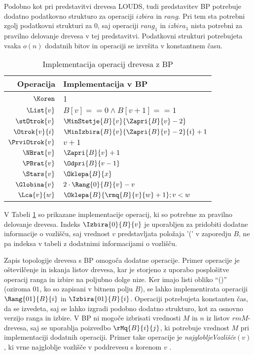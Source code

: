 Podobno kot pri predstavitvi drevesa LOUDS, tudi predstavitev BP potrebuje dodatno podatkovno strukturo za operaciji $izbira$ in $rang$. Pri tem sta potrebni zgolj podatkovni strukturi za $0$, saj  operaciji $rang_1$ in $izbira_1$ nista potrebni za pravilno delovanje drevesa v tej predstavitvi. Podatkovni strukturi potrebujeta vsaka $o(n)$ dodatnih bitov in operaciji se izvršita v konstantnem času.

\begin{table}[htb]
    \centering
      \caption{Implementacija operacij drevesa z BP}
    \begin{tabular}{r|l}
\textbf{Operacija}& \textbf{Implementacija v BP} \\\hline
         $\Koren$ &   1\\
         $\List{v}$ &    $B[v]==0 \wedge B[v+1]==1$\\
         $\stOtrok{v}$&  $\MinStetje{B}{v}{\Zapri{B}{v}-2}$\\
         $\Otrok{v}{i}$ &    $\MinIzbira{B}{v}{\Zapri{B}{v}-2}{i}+1$\\
         $\PrviOtrok{v}$&    $v+1$\\
         $\NBrat{v}$ &      $\Zapri{B}{v}+1$ \\
         $\PBrat{v}$ &      $\Odpri{B}{v-1}$ \\
         $\Stars{v}$ &      $\Oklepa{B}{x}$ \\
         $\Globina{v}$ &    $2\cdot \Rang{0}{B}{v}-v$ \\
         $\Lca{v}{w}$ &     $\Oklepa{B}{\rmq{B}{v}{w}+1};v<w$\\
    \end{tabular}  
    \label{tab:BPop}
\end{table}

V Tabeli \ref{tab:BPop} so prikazane implementacije operacij, ki so potrebne za pravilno delovanje drevesa. Indeks $\Izbira{0}{B}{v}$ je uporabljen za pridobiti dodatne informacije o vozlišču, saj vrednost $v$ predstavljata položaja '(' v zaporedju $B$, ne pa indeksa v tabeli z dodatnimi informacijami o vozlišču.

Zapis topologije drevesa s BP omogoča dodatne operacije. Primer operacije je oštevilčenje in iskanja listov drevesa, kar je storjeno z uporabo posplošitve operacij ranga in izbire na poljubno dolge nize. Ker imajo listi obliko \enquote{()} (oziroma $01$, ko so zapisani v bitnem polju $B$), se lahko implementirata operaciji $\Rang{01}{B}{i}$ in $\Izbira{01}{B}{i}$. Operaciji potrebujeta konstanten čas, da se izvedeta, saj se lahko izgradi podobno dodatno strukturo, kot za osnovno verzijo ranga in izbire. V BP ni mogoče izbrisati vrednosti $M$ in $n$ iz listov $rmM$-drevesa, saj se uporablja poizvedbo $\rMq{B}{i}{j}$, ki potrebuje vrednost $M$ pri implementaciji dodatnih operaciji. Primer take operacije je \textit{najglobljeVozlišče}$(v)$, ki vrne najgloblje vozlišče v poddrevesu s korenom $v$ \cite{Navarro2016}.
